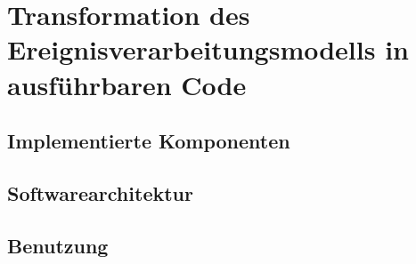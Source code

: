 \section{Transformation des Ereignisverarbeitungsmodells in ausführbaren Code}\label{sec:Transformation}

\subsection{Implementierte Komponenten}

\subsection{Softwarearchitektur}


\subsection{Benutzung}

